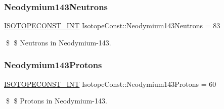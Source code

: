 \subsubsection{\texorpdfstring{Neodymium143\+Neutrons}{Neodymium143Neutrons}}
{\footnotesize\ttfamily \mbox{\hyperlink{group___isotope_const-_macros_ga5f18360b3e99483a35c32d789e62621c}{I\+S\+O\+T\+O\+P\+E\+C\+O\+N\+S\+T\+\_\+\+I\+NT}} Isotope\+Const\+::\+Neodymium143\+Neutrons = 83}

\$ \$ Neutrons in Neodymium-\/143. \mbox{\label{group___isotope_const-_neodymium-_nd143_gaa00c3d609915b47848dd7ce2ddc3e96d}} 
\subsubsection{\texorpdfstring{Neodymium143\+Protons}{Neodymium143Protons}}
{\footnotesize\ttfamily \mbox{\hyperlink{group___isotope_const-_macros_ga5f18360b3e99483a35c32d789e62621c}{I\+S\+O\+T\+O\+P\+E\+C\+O\+N\+S\+T\+\_\+\+I\+NT}} Isotope\+Const\+::\+Neodymium143\+Protons = 60}

\$ \$ Protons in Neodymium-\/143. 